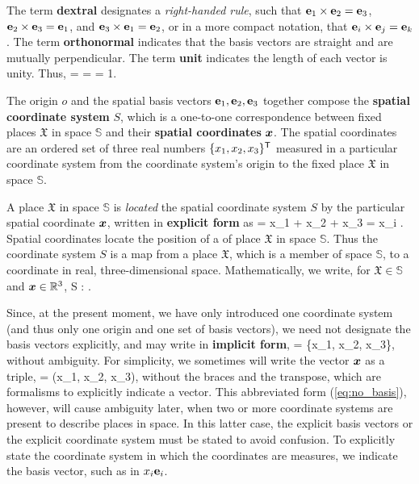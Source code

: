 The term {\bf dextral} designates a {\em right-handed rule}, 
such that 
$\mathbf{e}_1 \times \mathbf{e}_2 = \mathbf{e}_3$, 
$\mathbf{e}_2 \times \mathbf{e}_3 = \mathbf{e}_1$, and
$\mathbf{e}_3 \times \mathbf{e}_1 = \mathbf{e}_2$, or in a more
compact notation, that
$\mathbf{e}_i \times \mathbf{e}_j = \mathbf{e}_k$.
The term {\bf orthonormal} indicates that the basis vectors are straight and are mutually perpendicular.  
The term {\bf unit} indicates the length of each vector is unity.  Thus,
\be
\norm{\veone} \;\;=\;\;\norm{\vetwo} \;\;=\;\; 
\norm{\vethree} \;\;= 1.
\ee

The origin $o$ and the spatial basis vectors $\mathbf{e}_1, \mathbf{e}_2, \mathbf{e}_3$ together compose the {\bf spatial coordinate system} $S$, which is a one-to-one correspondence between fixed places $\mathfrak{X}$ in space $\mathbb{S}$ and their {\bf spatial coordinates} $\mbox{\boldmath $x$}$.
The spatial coordinates are an ordered set of three real numbers $\{x_1, x_2, x_3\}^{\mbox{\scriptsize \sffamily T}}$ measured in a particular coordinate system from the coordinate system's origin to the fixed place $\mathfrak{X}$ in space $\mathbb{S}$.  

A place $\mathfrak{X}$ in space $\mathbb{S}$ is {\em located} the spatial coordinate system $S$ by the particular spatial coordinate $\mbox{\boldmath $x$}$, written in {\bf explicit form} as
\be
\vx = x_1 \veone + x_2 \vetwo + x_3 \vethree = x_i \vesubi.
\ee
Spatial coordinates locate the position of a of place
$\mathfrak{X}$ in space $\mathbb{S}$.
Thus the coordinate system $S$ is a map from a place $\mathfrak{X}$, which is a member of space $\mathbb{S}$, to a coordinate in real, three-dimensional space.  Mathematically, we write, for $\mathfrak{X} \in \mathbb{S}$ and 
$\mbox{\boldmath $x$} \in \mathbb{R}^3$,
\be
 S :  \mapsto \vx.
\ee

Since, at the present moment, we have only introduced one coordinate system (and thus only one origin and one set of basis vectors), we need not designate the basis vectors explicitly, and may write in {\bf implicit form},
\be
\vx = \{x_1, x_2, x_3\}\transpose,
\label{eq:no_basis}
\ee 
without ambiguity.
For simplicity, we sometimes will write the vector $\mbox{\boldmath $x$}$ as a triple, 
\be
\vx = (x_1, x_2, x_3),
\ee
without the braces and the transpose, which are formalisms to explicitly indicate a vector.
This abbreviated form (\ref{eq:no_basis}), however, will cause ambiguity later, when two or more coordinate systems are present to describe places in space.  In this latter case, the explicit basis vectors or the explicit coordinate system must be stated to avoid confusion.  
To explicitly state the coordinate system in which the coordinates are measures, we indicate the basis vector, such as in $x_i \mathbf{e}_i$.


